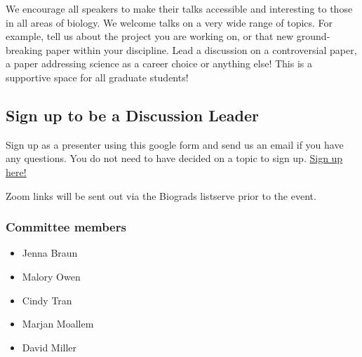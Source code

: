 \documentclass[
]{article}
\providecommand{\tightlist}{%
  \setlength{\itemsep}{0pt}\setlength{\parskip}{0pt}}
\begin{document}
We encourage all speakers to make their talks accessible and interesting
to those in all areas of biology. We welcome talks on a very wide range
of topics. For example, tell us about the project you are working on, or
that new ground-breaking paper within your discipline. Lead a discussion
on a controversial paper, a paper addressing science as a career choice
or anything else! This is a supportive space for all graduate students!

\hypertarget{sign-up-to-be-a-discussion-leader}{%
\subsection{Sign up to be a Discussion
Leader}\label{sign-up-to-be-a-discussion-leader}}

Sign up as a presenter using this google form and send us an email if
you have any questions. You do not need to have decided on a topic to
sign up.
\href{https://docs.google.com/forms/d/e/1FAIpQLSdAdlvA4kEKg68sLV6CCKkBobYLIipfGbs_FrUJab_jkkqqiQ/viewform?usp=sf_link}{Sign
up here!}

Zoom links will be sent out via the Biograds listserve prior to the
event.

\hypertarget{committee-members}{%
\subsubsection{Committee members}\label{committee-members}}

\begin{itemize}
\tightlist
\item
  Jenna Braun
\item
  Malory Owen
\item
  Cindy Tran
\item
  Marjan Moallem
\item
  David Miller
\end{itemize}
\end{document}
